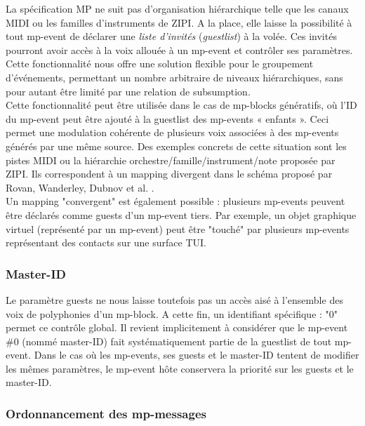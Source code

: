 \noindent La spécification MP ne suit pas d'organisation hiérarchique telle que les canaux \gls{MIDI} ou les familles d'instruments de ZIPI. A la place, elle laisse la possibilité à tout mp-event de déclarer une \textit{liste d'invités} (\textit{guestlist}) à la volée. Ces invités pourront avoir accès à la voix allouée à un mp-event et contrôler ses paramètres. Cette fonctionnalité nous offre une solution flexible pour le groupement d'événements, permettant un nombre arbitraire de niveaux hiérarchiques, sans pour autant être limité par une relation de subsumption.\\
\indent Cette fonctionnalité peut être utilisée dans le cas de mp-blocks génératifs, où l'ID du mp-event peut être ajouté à la guestlist des mp-events « enfants ». Ceci permet une modulation cohérente de plusieurs voix associées à des mp-events générés par une même source. Des exemples concrets de cette situation sont les pistes \gls{MIDI} ou la hiérarchie orchestre/famille/instrument/note proposée par \gls{ZIPI}. Ils correspondent à un mapping divergent dans le schéma proposé par Rovan, Wanderley, Dubnov et al. \cite{rovan_instrumental_1997}.\\
\indent Un mapping "convergent" est également possible : plusieurs mp-events peuvent être déclarés comme guests d'un mp-event tiers. Par exemple, un objet graphique virtuel (représenté par un mp-event) peut être "touché" par plusieurs mp-events représentant des contacts sur une surface \gls{TUI}.

\subsubsection{Master-ID}

\noindent Le paramètre guests ne nous laisse toutefois pas un accès aisé à l'ensemble des voix de polyphonies d'un mp-block. A cette fin, un identifiant spécifique : "0" permet ce contrôle global. Il revient implicitement à considérer que le mp-event \#0 (nommé master-ID) fait systématiquement partie de la guestlist de tout mp-event. Dans le cas où les mp-events, ses guests et le master-ID tentent de modifier les mêmes paramètres, le mp-event hôte conservera la priorité sur les guests et le master-ID.

\subsubsection{Ordonnancement des mp-messages}

